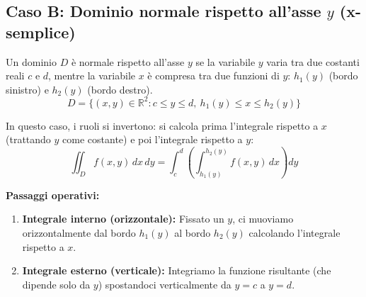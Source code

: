 \subsection{Caso B: Dominio normale rispetto all'asse $y$ (x-semplice)}

Un dominio $D$ è normale rispetto all'asse $y$ se la variabile $y$ varia tra due costanti reali $c$ e $d$, mentre la variabile $x$ è compresa tra due funzioni di $y$: $h_1(y)$ (bordo sinistro) e $h_2(y)$ (bordo destro).
\[
D = \{(x,y) \in \mathbb{R}^2 : c \le y \le d, \ h_1(y) \le x \le h_2(y)\}
\]

\begin{center}
\end{center}

In questo caso, i ruoli si invertono: si calcola prima l'integrale rispetto a $x$ (trattando $y$ come costante) e poi l'integrale rispetto a $y$:
\[
\iint_D f(x,y) \, dx \, dy = \int_{c}^{d} \left( \int_{h_1(y)}^{h_2(y)} f(x,y) \, dx \right) dy
\]

\textbf{Passaggi operativi:}
\begin{enumerate}
    \item \textbf{Integrale interno (orizzontale):} Fissato un $y$, ci muoviamo orizzontalmente dal bordo $h_1(y)$ al bordo $h_2(y)$ calcolando l'integrale rispetto a $x$.
    \item \textbf{Integrale esterno (verticale):} Integriamo la funzione risultante (che dipende solo da $y$) spostandoci verticalmente da $y = c$ a $y = d$.
\end{enumerate}



